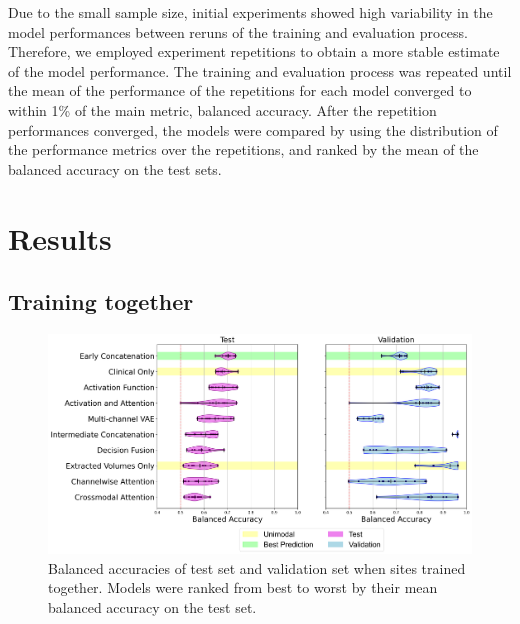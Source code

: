 Due to the small sample size, initial experiments showed high variability in the model performances between reruns of the training and evaluation process.
Therefore, we employed experiment repetitions to obtain a more stable estimate of the model performance.
The training and evaluation process was repeated until the mean of the performance of the repetitions for each model converged to within 1\% of the main metric, balanced accuracy.
After the repetition performances converged, the models were compared by using the distribution of the performance metrics over the repetitions, and ranked by the mean of the balanced accuracy on the test sets.


\section{Results}
\subsection{Training together}

\begin{figure}
    \centering
    \hspace*{-2cm}
    \includegraphics[width=1.2\linewidth]{figures/both_sites_together_balanced_accuracy_violin}
    \caption{Balanced accuracies of test set and validation set when sites trained together.
    Models were ranked from best to worst by their mean balanced accuracy on the test set.}
    \label{fig:trainedtogetherviolin}
\end{figure}

